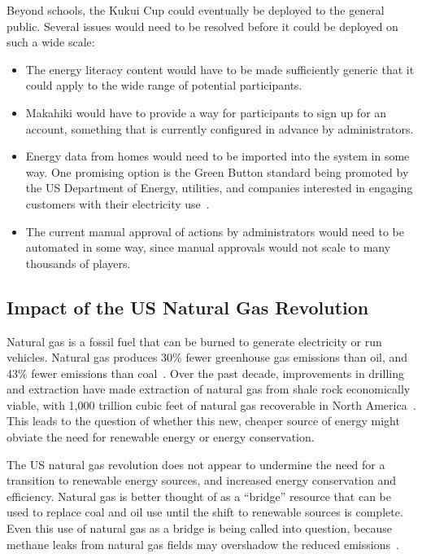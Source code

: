 Beyond schools, the Kukui Cup could eventually be deployed to the general public. Several issues would need to be resolved before it could be deployed on such a wide scale:

\begin{itemize}
	\item The energy literacy content would have to be made sufficiently generic that it could apply to the wide range of potential participants.
	\item Makahiki would have to provide a way for participants to sign up for an account, something that is currently configured in advance by administrators.
	\item Energy data from homes would need to be imported into the system in some way. One promising option is the Green Button standard being promoted by the US Department of Energy, utilities, and companies interested in engaging customers with their electricity use~\cite{green-button}.
	\item The current manual approval of actions by administrators would need to be automated in some way, since manual approvals would not scale to many thousands of players.
\end{itemize}


\subsection{Impact of the US Natural Gas Revolution}

Natural gas is a fossil fuel that can be burned to generate electricity or run vehicles. Natural gas produces 30\% fewer greenhouse gas emissions than oil, and 43\% fewer emissions than coal~\cite{UCS-naturalgas}. Over the past decade, improvements in drilling and extraction have made extraction of natural gas from shale rock economically viable, with 1,000 trillion cubic feet of natural gas recoverable in North America~\cite{Jaffe2010}. This leads to the question of whether this new, cheaper source of energy might obviate the need for renewable energy or energy conservation.

The US natural gas revolution does not appear to undermine the need for a transition to renewable energy sources, and increased energy conservation and efficiency. Natural gas is better thought of as a ``bridge'' resource that can be used to replace coal and oil use until the shift to renewable sources is complete. Even this use of natural gas as a bridge is being called into question, because methane leaks from natural gas fields may overshadow the reduced \COtwo emissions~\cite{Tollefson2013}.

